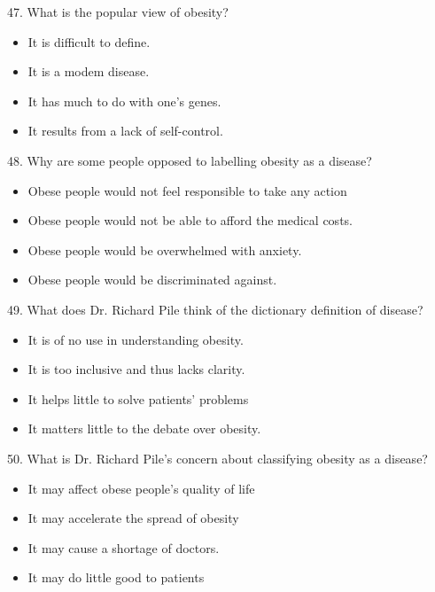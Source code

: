 \documentclass[UTF8,11pt]{ctexart}
\begin{document}
47. What is the popular view of obesity?


\begin{itemize}[leftmargin=2em,itemsep=.2em,topsep=.4em]\item[A.] It is difficult to define.
\item[B.] It is a modem disease.
\item[C.] It has much to do with one's genes.
\item[D.] It results from a lack of self-control.
\end{itemize}

48. Why are some people opposed to labelling obesity as a disease?


\begin{itemize}[leftmargin=2em,itemsep=.2em,topsep=.4em]\item[A.] Obese people would not feel responsible to take any action
\item[B.] Obese people would not be able to afford the medical costs.
\item[C.] Obese people would be overwhelmed with anxiety.
\item[D.] Obese people would be discriminated against.
\end{itemize}

49. What does Dr. Richard Pile think of the dictionary definition of disease?


\begin{itemize}[leftmargin=2em,itemsep=.2em,topsep=.4em]\item[A.] It is of no use in understanding obesity.
\item[B.] It is too inclusive and thus lacks clarity.
\item[C.] It helps little to solve patients' problems
\item[D.] It matters little to the debate over obesity.
\end{itemize}

50. What is Dr. Richard Pile's concern about classifying obesity as a disease?


\begin{itemize}[leftmargin=2em,itemsep=.2em,topsep=.4em]\item[A.] It may affect obese people's quality of life
\end{itemize}

\begin{itemize}[leftmargin=2em,itemsep=.2em,topsep=.4em]\item[B.] It may accelerate the spread of obesity
\item[C.] It may cause a shortage of doctors.
\item[D.] It may do little good to patients
\end{itemize}
\end{document}
